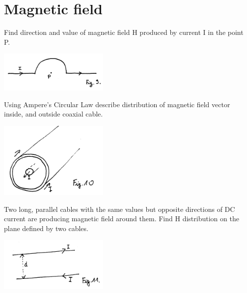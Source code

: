 \section{Magnetic field}

\begin{Exercise}[difficulty=1]
Find direction and value of magnetic field H produced by current I in the point P. 
\begin{center}
\includegraphics[width=0.4\textwidth]{img/fig_m1.png} 
\end{center}
\end{Exercise}

\begin{Exercise}[difficulty=3]
Using Ampere's Circular Law describe distribution of magnetic field vector inside, and outside coaxial cable.
\begin{center}
\includegraphics[width=0.4\textwidth]{img/fig_m2.png} 
\end{center}
\end{Exercise}

\begin{Exercise}[difficulty=2]
Two long, parallel cables with the same values but opposite directions of DC current are producing magnetic field around them. Find H distribution on the plane defined by two cables. 
\begin{center}
\includegraphics[width=0.4\textwidth]{img/fig_m3.png} 
\end{center}
\end{Exercise}

